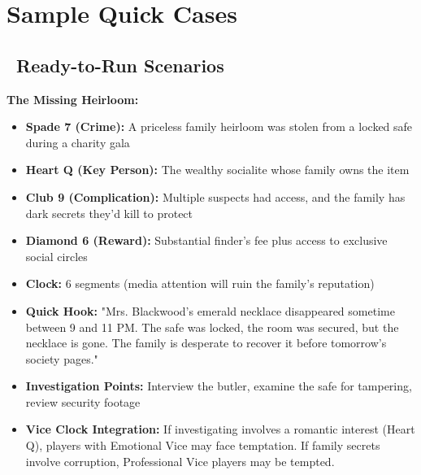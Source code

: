 \documentclass[11pt]{article}
\begin{document}
\newpage

\section{Sample Quick Cases}

\subsection*{\faLightbulb\ Ready-to-Run Scenarios}

\textbf{The Missing Heirloom:}
\begin{itemize}
    \item \textbf{Spade 7 (Crime):} A priceless family heirloom was stolen from a locked safe during a charity gala
    \item \textbf{Heart Q (Key Person):} The wealthy socialite whose family owns the item
    \item \textbf{Club 9 (Complication):} Multiple suspects had access, and the family has dark secrets they'd kill to protect
    \item \textbf{Diamond 6 (Reward):} Substantial finder's fee plus access to exclusive social circles
    \item \textbf{Clock:} 6 segments (media attention will ruin the family's reputation)
    \item \textbf{Quick Hook:} "Mrs. Blackwood's emerald necklace disappeared sometime between 9 and 11 PM. The safe was locked, the room was secured, but the necklace is gone. The family is desperate to recover it before tomorrow's society pages."
    \item \textbf{Investigation Points:} Interview the butler, examine the safe for tampering, review security footage
    \item \textbf{Vice Clock Integration:} If investigating involves a romantic interest (Heart Q), players with Emotional Vice may face temptation. If family secrets involve corruption, Professional Vice players may be tempted.
\end{itemize}
\end{document}
